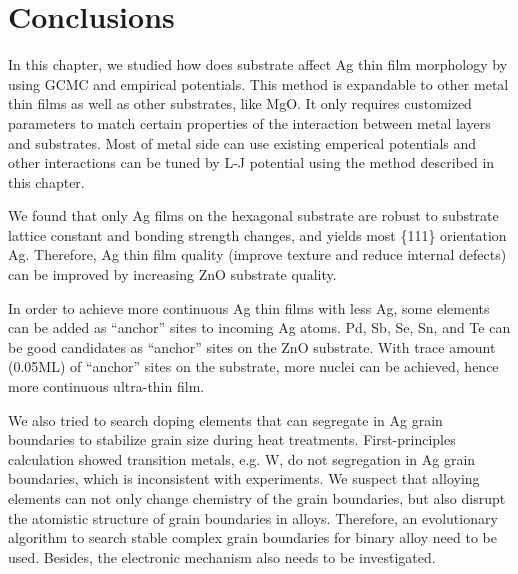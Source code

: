 \section{Conclusions}
In this chapter, we studied how does substrate affect Ag thin film morphology by using \ac{GCMC} and empirical potentials. This method is expandable to other metal thin films as well as other substrates, like MgO. It only requires customized parameters to match certain properties of the interaction between metal layers and substrates. Most of metal side can use existing emperical potentials and other interactions can be tuned by L-J potential using the method described in this chapter.

We found that only Ag films on the hexagonal substrate are robust to substrate lattice constant and bonding strength changes, and yields most \{111\} orientation Ag. Therefore, Ag thin film quality (improve texture and reduce internal defects) can be improved by increasing ZnO substrate quality.

In order to achieve more continuous Ag thin films with less Ag, some elements can be added as ``anchor'' sites to incoming Ag atoms. Pd, Sb, Se, Sn, and Te can be good candidates as ``anchor'' sites on the ZnO substrate. With trace amount (0.05\ac{ML}) of ``anchor'' sites on the substrate, more nuclei can be achieved, hence more continuous ultra-thin film.

We also tried to search doping elements that can segregate in Ag grain boundaries to stabilize grain size during heat treatments. First-principles calculation showed transition metals, e.g. W, do not segregation in Ag grain boundaries, which is inconsistent with experiments. We suspect that alloying elements can not only change chemistry of the grain boundaries, but also disrupt the atomistic structure of grain boundaries in alloys. Therefore, an evolutionary algorithm to search stable complex grain boundaries for binary alloy need to be used. Besides, the electronic mechanism also needs to be investigated.